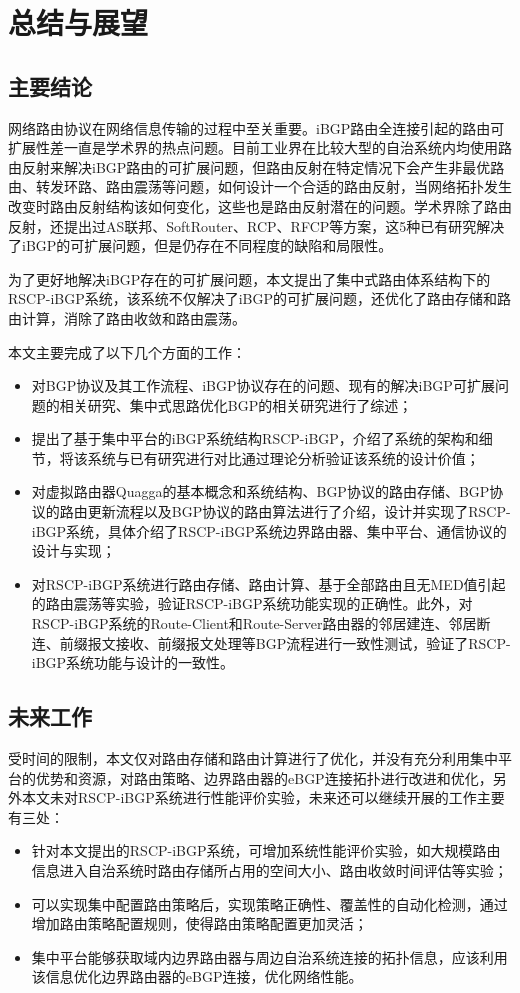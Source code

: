 \chapter{总结与展望}
\label{cha:summary}



\section{主要结论}
网络路由协议在网络信息传输的过程中至关重要。iBGP路由全连接引起的路由可扩展性差一直是学术界的热点问题。目前工业界在比较大型的自治系统内均使用路由反射来解决iBGP路由的可扩展问题，但路由反射在特定情况下会产生非最优路由、转发环路、路由震荡等问题，如何设计一个合适的路由反射，当网络拓扑发生改变时路由反射结构该如何变化，这些也是路由反射潜在的问题。学术界除了路由反射，还提出过AS联邦、SoftRouter、RCP、RFCP等方案，这5种已有研究解决了iBGP的可扩展问题，但是仍存在不同程度的缺陷和局限性。

为了更好地解决iBGP存在的可扩展问题，本文提出了集中式路由体系结构下的RSCP-iBGP系统，该系统不仅解决了iBGP的可扩展问题，还优化了路由存储和路由计算，消除了路由收敛和路由震荡。

本文主要完成了以下几个方面的工作：
\begin{itemize}
  \item 对BGP协议及其工作流程、iBGP协议存在的问题、现有的解决iBGP可扩展问题的相关研究、集中式思路优化BGP的相关研究进行了综述；
  \item 提出了基于集中平台的iBGP系统结构RSCP-iBGP，介绍了系统的架构和细节，将该系统与已有研究进行对比通过理论分析验证该系统的设计价值；
  \item 对虚拟路由器Quagga的基本概念和系统结构、BGP协议的路由存储、BGP协议的路由更新流程以及BGP协议的路由算法进行了介绍，设计并实现了RSCP-iBGP系统，具体介绍了RSCP-iBGP系统边界路由器、集中平台、通信协议的设计与实现；
  \item 对RSCP-iBGP系统进行路由存储、路由计算、基于全部路由且无MED值引起的路由震荡等实验，验证RSCP-iBGP系统功能实现的正确性。此外，对RSCP-iBGP系统的Route-Client和Route-Server路由器的邻居建连、邻居断连、前缀报文接收、前缀报文处理等BGP流程进行一致性测试，验证了RSCP-iBGP系统功能与设计的一致性。
\end{itemize}


\section{未来工作}

受时间的限制，本文仅对路由存储和路由计算进行了优化，并没有充分利用集中平台的优势和资源，对路由策略、边界路由器的eBGP连接拓扑进行改进和优化，另外本文未对RSCP-iBGP系统进行性能评价实验，未来还可以继续开展的工作主要有三处：

\begin{itemize}
  \item 针对本文提出的RSCP-iBGP系统，可增加系统性能评价实验，如大规模路由信息进入自治系统时路由存储所占用的空间大小、路由收敛时间评估等实验；
  \item 可以实现集中配置路由策略后，实现策略正确性、覆盖性的自动化检测，通过增加路由策略配置规则，使得路由策略配置更加灵活；
  \item 集中平台能够获取域内边界路由器与周边自治系统连接的拓扑信息，应该利用该信息优化边界路由器的eBGP连接，优化网络性能。
\end{itemize} 